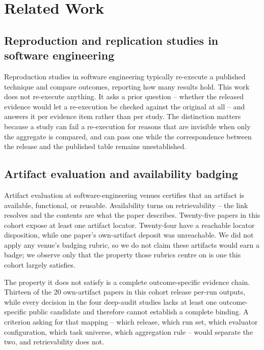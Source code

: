 \section{Related Work}
\label{sec:relatedwork}

\subsection{Reproduction and replication studies in software engineering}

Reproduction studies in software engineering typically re-execute a published technique and
compare outcomes, reporting how many results hold. This work does not re-execute anything.
It asks a prior question -- whether the released evidence would let a re-execution be checked
against the original at all -- and answers it per evidence item rather than per study. The
distinction matters because a study can fail a re-execution for reasons that are invisible
when only the aggregate is compared, and can pass one while the correspondence between the
release and the published table remains unestablished.

\subsection{Artifact evaluation and availability badging}

Artifact evaluation at software-engineering venues certifies that an artifact is available,
functional, or reusable. Availability turns on retrievability -- the link resolves and the
contents are what the paper describes. Twenty-five papers in this cohort expose at least one
artifact locator. Twenty-four have a reachable locator disposition, while one paper's
own-artifact deposit was unreachable. We did not apply any venue's badging
rubric, so we do not claim these artifacts would earn a badge; we observe only that the
property those rubrics centre on is one this cohort largely satisfies.

The property it does not satisfy is a complete outcome-specific evidence chain. Thirteen of
the 20 own-artifact papers in this cohort release per-run outputs, while every decision in the
four deep-audit studies lacks at least one outcome-specific public candidate and therefore
cannot establish a complete binding. A
criterion asking for that mapping -- which release, which run set, which evaluator
configuration, which task universe, which aggregation rule -- would separate the two, and
retrievability does not.

